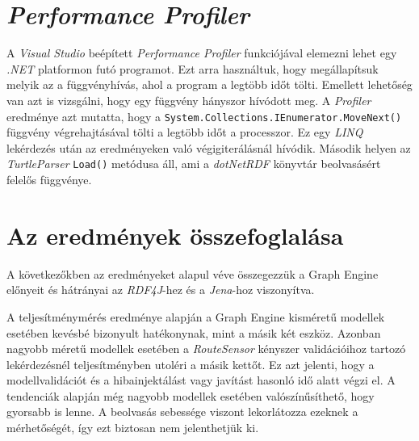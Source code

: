 %
%
%
%

\section{\emph{Performance Profiler}}

A \emph{Visual Studio} beépített \emph{Performance Profiler} funkciójával elemezni lehet egy \emph{.NET} platformon futó programot. Ezt arra használtuk, hogy megállapítsuk melyik az a függvényhívás, ahol a program a legtöbb időt tölti. Emellett lehetőség van azt is vizsgálni, hogy egy függvény hányszor hívódott meg. A \emph{Profiler} eredménye azt mutatta, hogy a \texttt{System.Collections.IEnumerator.MoveNext()} függvény végrehajtásával tölti a legtöbb időt a processzor. Ez egy \emph{LINQ} lekérdezés után az eredményeken való végigiterálásnál hívódik. Második helyen az \emph{TurtleParser} \texttt{Load()} metódusa áll, ami a \emph{dotNetRDF} könyvtár beolvasásért felelős függvénye.

\section{Az eredmények összefoglalása}

A következőkben az eredményeket alapul véve összegezzük a Graph Engine előnyeit és hátrányai az \emph{RDF4J}-hez és a \emph{Jena}-hoz viszonyítva. 

A teljesítménymérés eredménye alapján a Graph Engine  kisméretű modellek esetében kevésbé bizonyult hatékonynak, mint a másik két eszköz. Azonban nagyobb méretű modellek esetében a \emph{RouteSensor} kényszer validációihoz tartozó lekérdezésnél teljesítményben utoléri a másik kettőt. Ez azt jelenti, hogy a modellvalidációt és a hibainjektálást vagy javítást hasonló idő alatt végzi el. A tendenciák alapján még nagyobb modellek esetében valószínűsíthető, hogy gyorsabb is lenne.  A beolvasás sebessége viszont lekorlátozza ezeknek a mérhetőségét, így ezt biztosan nem jelenthetjük ki.

